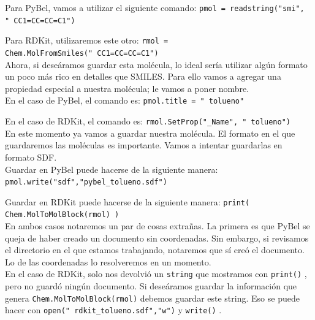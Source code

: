 \documentclass[10pt,letterpaper]{article}
\newcommand{\inlinecode}[1]{
\colorbox{light-gray}{\texttt{#1}}
}
\begin{document}
\noindent Para PyBel, vamos a utilizar el siguiente comando: \inlinecode{pmol = readstring("smi", "\ \hspace*{-2mm}CC1=CC=CC=C1")}

\noindent Para RDKit, utilizaremos este otro: \inlinecode{rmol = Chem.MolFromSmiles("\ \hspace*{-2mm}CC1=CC=CC=C1")}\\

Ahora, si dese\'aramos guardar esta mol\'ecula, lo ideal ser\'ia utilizar alg\'un formato un poco m\'as rico en detalles que SMILES. Para ello vamos a agregar una propiedad especial a nuestra mol\'ecula; le vamos a poner nombre.\\

\noindent En el caso de PyBel, el comando es: \inlinecode{pmol.title = "\ \hspace*{-2mm}tolueno"}

\noindent En el caso de RDKit, el comando es: \inlinecode{rmol.SetProp("\_Name", "\ \hspace*{-2mm}tolueno")}\\

En este momento ya vamos a guardar nuestra mol\'ecula. El formato en el que guardaremos las mol\'eculas es importante. Vamos a intentar guardarlas en formato SDF.\\

\noindent Guardar en PyBel puede hacerse de la siguiente manera: \inlinecode{pmol.write("sdf","pybel\_tolueno.sdf")}

\noindent Guardar en RDKit puede hacerse de la siguiente manera: \inlinecode{print( Chem.MolToMolBlock(rmol) )}\\

En ambos casos notaremos un par de cosas extra\~nas. La primera es que PyBel se queja de haber creado un documento sin coordenadas. Sin embargo, si revisamos el directorio en el que estamos trabajando, notaremos que s\'i cre\'o el documento. Lo de las coordenadas lo resolveremos en un momento.\\

En el caso de RDKit, solo nos devolvi\'o un \inlinecode{string} que mostramos con \inlinecode{print()}, pero no guard\'o ning\'un documento. Si dese\'aramos guardar la informaci\'on que genera \inlinecode{Chem.MolToMolBlock(rmol)} debemos guardar este string. Eso se puede hacer con \inlinecode{open("\ \hspace*{-2mm}rdkit\_tolueno.sdf","w")} y \inlinecode{write()}.
\end{document}
